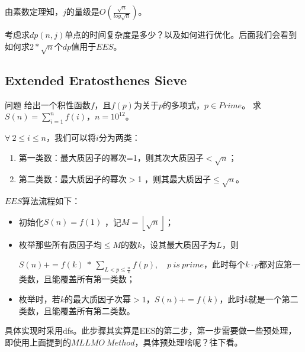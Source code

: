 由素数定理知，$j$的量级是$O(\frac{\sqrt{n}}{log\sqrt{n}})$。

\begin{note}
考虑求$dp(n,j)$单点的时间复杂度是多少？以及如何进行优化。后面我们会看到如何求$2*\sqrt{n}$个$dp$值用于$EES$。
\end{note}

\subsection{Extended Eratosthenes Sieve}
\begin{custom}{问题}
给出一个积性函数$f$，且$f(p)$为关于$p$的多项式，$p\in Prime$。
求$S(n)=\sum_{i=1}^nf(i)$，$n=10^{12}$。
\end{custom}

\begin{solution}
$\forall  \ 2\le i\le n$，我们可以将$i$分为两类：
\begin{enumerate}
	\item 第一类数：最大质因子的幂次=1，则其次大质因子$< \sqrt{n}$；
	\item 第二类数：最大质因子的幂次$>$1 ，则其最大质因子$\le \sqrt{n}$。
\end{enumerate}

\vbox{}

{\heiti $EES$算法流程如下：}
\begin{itemize}
	\item 初始化$S(n)=f(1)$ ，记$M=\left\lfloor \sqrt{n} \right\rfloor$；
	\item 枚举那些所有质因子均$\le M$的数$k$，设其最大质因子为$L$，则
	
	$S(n)+=f(k)\ *\ \sum_{L<p\le \frac n k}f(p), \quad p \ is \ prime $，此时每个$k\cdot p$都对应第一类数，且能覆盖所有第一类数；
	\item 枚举时，若$k$的最大质因子次幂$>1$，$S(n)+=f(k)$，此时$k$就是一个第二类数，且能覆盖所有第二类数。
\end{itemize}
\begin{note}
	具体实现时采用dfs。此步骤其实算是EES的第二步，第一步需要做一些预处理，即使用上面提到的$MLLMO\ Method$，具体预处理啥呢？往下看。
\end{note}

\vbox{}


\end{solution}
